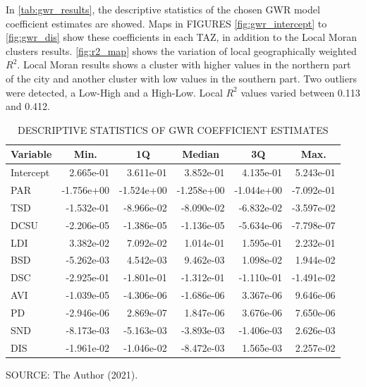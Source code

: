 
In \autoref{tab:gwr_results}, the descriptive statistics of the chosen GWR model coefficient estimates are showed. Maps in FIGURES \ref{fig:gwr_intercept} to \ref{fig:gwr_dis} show these coefficients in each TAZ, in addition to the Local Moran clusters results. \autoref{fig:r2_map} shows the variation of local geographically weighted $R^2$. Local Moran results shows a cluster with higher values in the northern part of the city and another cluster with low values in the southern part. Two outliers were detected, a Low-High and a High-Low. Local $R^2$ values varied between 0.113 and 0.412. 

\begin{table}[!htbp]
    \footnotesize
    \captionsetup{justification=raggedright,
        singlelinecheck=false,
        font=footnotesize}
    \caption{DESCRIPTIVE STATISTICS OF GWR COEFFICIENT ESTIMATES}
    \centering
    \begin{tabular}{lrrrrr}
        \hline
        \multicolumn{1}{c}{\textbf{Variable}} & \multicolumn{1}{c}{\textbf{Min.}} & \multicolumn{1}{c}{\textbf{1Q}} & \multicolumn{1}{c}{\textbf{Median}} & \multicolumn{1}{c}{\textbf{3Q}} & \multicolumn{1}{c}{\textbf{Max.}} \\
        \hline
        Intercept & 2.665e-01 & 3.611e-01 & 3.852e-01 & 4.135e-01 & 5.243e-01 \\ 
        PAR & -1.756e+00 & -1.524e+00 & -1.258e+00 & -1.044e+00 & -7.092e-01 \\ 
        TSD & -1.532e-01 & -8.966e-02 & -8.090e-02 & -6.832e-02 & -3.597e-02 \\
        DCSU & -2.206e-05 & -1.386e-05 & -1.136e-05 & -5.634e-06 & -7.798e-07 \\
        LDI & 3.382e-02 & 7.092e-02 & 1.014e-01 & 1.595e-01 & 2.232e-01 \\ 
        BSD & -5.262e-03 & 4.542e-03 & 9.462e-03 & 1.098e-02 & 1.944e-02 \\
        DSC & -2.925e-01 & -1.801e-01 & -1.312e-01 & -1.110e-01 & -1.491e-02 \\
        AVI & -1.039e-05 & -4.306e-06 & -1.686e-06 & 3.367e-06 & 9.646e-06 \\
        PD & -2.946e-06 & 2.869e-07 & 1.847e-06 & 3.676e-06 & 7.650e-06 \\
        SND & -8.173e-03 & -5.163e-03 & -3.893e-03 & -1.406e-03 & 2.626e-03 \\
        DIS & -1.961e-02 & -1.046e-02 & -8.472e-03 & 1.565e-03 & 2.257e-02 \\
        \hline
    \end{tabular}
    \label{tab:gwr_results}
    \par \vspace{2mm} \footnotesize \raggedright
    SOURCE: The Author (2021).
\end{table}

